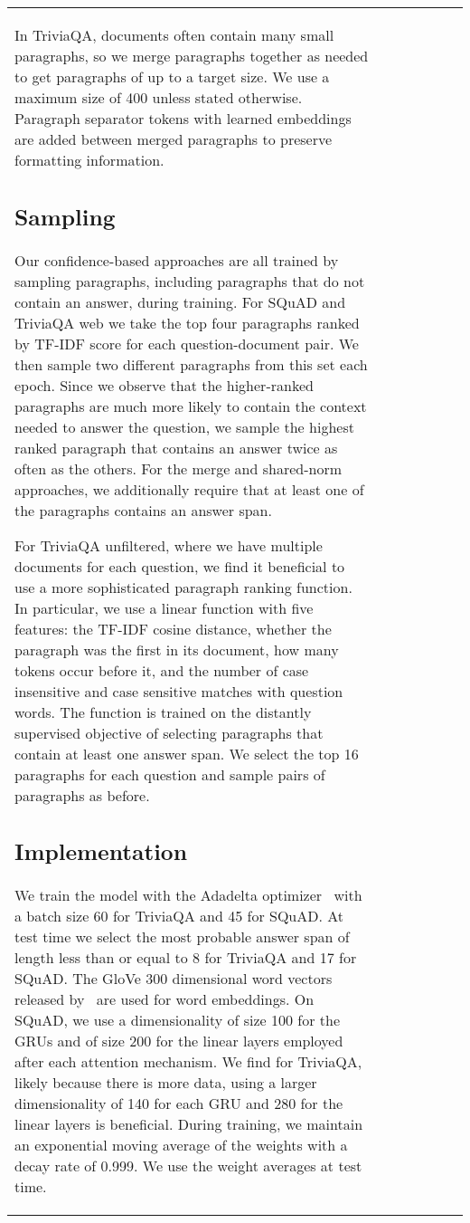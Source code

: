 \documentclass[11pt,a4paper]{article}
\begin{document}
\begin{table*}
\begin{small}
\begin{center}
\begin{tabular}{ | l | l | l | c | l | l | c |}
In TriviaQA, documents often contain many small paragraphs, so we merge paragraphs together as needed to get paragraphs of up to a target size. We use a maximum size of 400 unless stated otherwise. Paragraph separator tokens with learned embeddings are added between merged paragraphs to preserve formatting information.

\subsection{Sampling}
Our confidence-based approaches are all trained by sampling paragraphs, including paragraphs that do not contain an answer, during training. For SQuAD and TriviaQA web we take the top four paragraphs ranked by TF-IDF score for each question-document pair. We then sample two different paragraphs from this set each epoch. Since we observe that the higher-ranked paragraphs are much more likely to contain the context needed to answer the question, we sample the highest ranked paragraph that contains an answer twice as often as the others. For the merge and shared-norm approaches, we additionally require that at least one of the paragraphs contains an answer span. 

For TriviaQA unfiltered, where we have multiple documents for each question, we find it beneficial to use a more sophisticated paragraph ranking function. In particular, we use a linear function with five features: the TF-IDF cosine distance, whether the paragraph was the first in its document, how many tokens occur before it, and the number of case insensitive and case sensitive matches with question words. The function is trained on the distantly supervised objective of selecting paragraphs that contain at least one answer span. We select the top 16 paragraphs for each question and sample pairs of paragraphs as before.

\subsection{Implementation}
We train the model with the Adadelta optimizer~\cite{zeiler2012adadelta} with a batch size 60 for TriviaQA and 45 for SQuAD. At test time we select the most probable answer span of length less than or equal to 8 for TriviaQA and 17 for SQuAD. The GloVe 300 dimensional word vectors released by~\citet{pennington2014glove} are used for word embeddings. On SQuAD, we use a dimensionality of size 100 for the GRUs and of size 200 for the linear layers employed after each attention mechanism. We find for TriviaQA, likely because there is more data, using a larger dimensionality of 140 for each GRU and 280 for the linear layers is beneficial. During training, we maintain an exponential moving average of the weights with a decay rate of 0.999. We use the weight averages at test time.


\end{tabular}
\end{center}
\end{small}
\end{table*}
\end{document}
